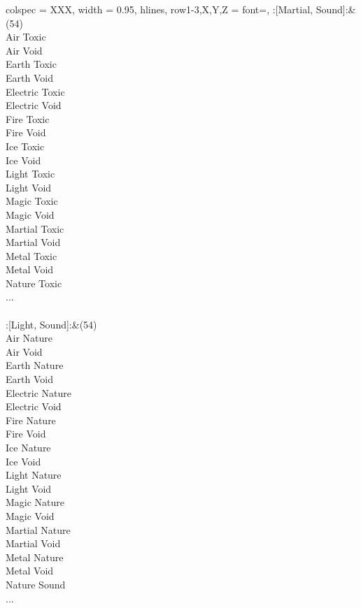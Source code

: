 \begin{longtblr}[
	caption = {2v2 Defending Weak},
	label = {2v2-Defending-Weak},
]{
	colspec = {XXX}, width = 0.95\linewidth,
	hlines,
	row{1-3,X,Y,Z} = {font=\bfseries},
}
	:[Martial, Sound]:&{(54)\\
	Air Toxic \\
	Air Void \\
	Earth Toxic \\
	Earth Void \\
	Electric Toxic \\
	Electric Void \\
	Fire Toxic \\
	Fire Void \\
	Ice Toxic \\
	Ice Void \\
	Light Toxic \\
	Light Void \\
	Magic Toxic \\
	Magic Void \\
	Martial Toxic \\
	Martial Void \\
	Metal Toxic \\
	Metal Void \\
	Nature Toxic \\
	...\\
	}\\

	:[Light, Sound]:&{(54)\\
	Air Nature \\
	Air Void \\
	Earth Nature \\
	Earth Void \\
	Electric Nature \\
	Electric Void \\
	Fire Nature \\
	Fire Void \\
	Ice Nature \\
	Ice Void \\
	Light Nature \\
	Light Void \\
	Magic Nature \\
	Magic Void \\
	Martial Nature \\
	Martial Void \\
	Metal Nature \\
	Metal Void \\
	Nature Sound \\
	...\\
	}\\


\end{longtblr}
